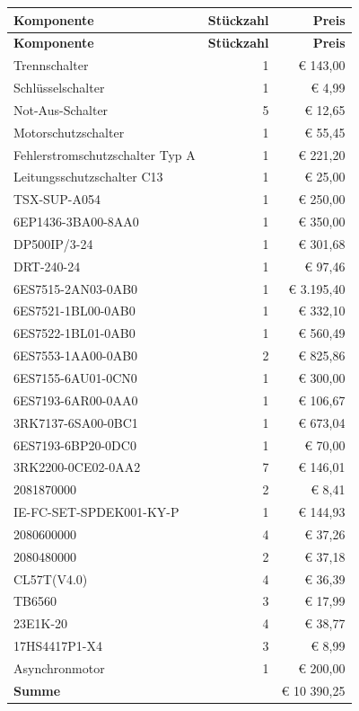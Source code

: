 \begin{longtable}{|p{7cm}|r|r|}
    \hline
    \textbf{Komponente} & \textbf{Stückzahl} & \textbf{Preis} \\
    \hline
    \endfirsthead

    \hline
    \textbf{Komponente} & \textbf{Stückzahl} & \textbf{Preis} \\
    \hline
    \endhead

    \hline
    \endfoot

    \hline
    \endlastfoot
    Trennschalter & 1 & € 143,00 \\
    Schlüsselschalter & 1 & € 4,99 \\
    Not-Aus-Schalter & 5 & € 12,65 \\
    Motorschutzschalter & 1 & € 55,45 \\
    Fehlerstromschutzschalter Typ A & 1 & € 221,20 \\
    Leitungsschutzschalter C13 & 1 & € 25,00 \\
    TSX-SUP-A054 & 1 & € 250,00 \\
    6EP1436-3BA00-8AA0 & 1 & € 350,00 \\
    DP500IP/3-24 & 1 & € 301,68 \\
    DRT-240-24 & 1 & € 97,46 \\
    6ES7515-2AN03-0AB0 & 1 & € 3.195,40 \\
    6ES7521-1BL00-0AB0 & 1 & € 332,10 \\
    6ES7522-1BL01-0AB0 & 1 & € 560,49 \\
    6ES7553-1AA00-0AB0 & 2 & € 825,86 \\
    6ES7155-6AU01-0CN0 & 1 & € 300,00 \\
    6ES7193-6AR00-0AA0 & 1 & € 106,67 \\
    3RK7137-6SA00-0BC1 & 1 & € 673,04 \\
    6ES7193-6BP20-0DC0 & 1 & € 70,00 \\
    3RK2200-0CE02-0AA2 & 7 & € 146,01 \\
    2081870000 & 2 & € 8,41 \\
    IE-FC-SET-SPDEK001-KY-P & 1 & € 144,93 \\
    2080600000 & 4 & € 37,26 \\
    2080480000 & 2 & € 37,18 \\
    CL57T(V4.0) & 4 & € 36,39 \\
    TB6560 & 3 & € 17,99 \\
    23E1K-20 & 4 & € 38,77 \\
    17HS4417P1-X4 & 3 & € 8,99 \\
    Asynchronmotor & 1 & € 200,00 \\
    \hline
    \hline
    \textbf{Summe} & & € 10 390,25 \\
\end{longtable}
\newpage


